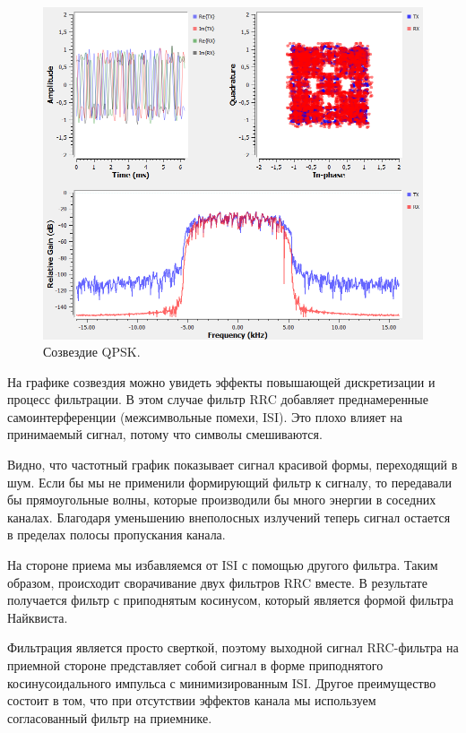 \documentclass[a4paper, 14pt]{extarticle}
\begin{document}
    \begin{figure}[h]
        \centering
        \includegraphics[width=0.8\linewidth]{resources/Images/task1_up_samling}
        \caption{Созвездие QPSK.}
        \label{fig:task1_up_samling}
    \end{figure}

    На графике созвездия можно увидеть эффекты повышающей дискретизации и процесс фильтрации.
    В этом случае фильтр RRC добавляет преднамеренные самоинтерференции (межсимвольные помехи, ISI).
    Это плохо влияет на принимаемый сигнал, потому что символы смешиваются.

    Видно, что частотный график показывает сигнал красивой формы, переходящий в шум.
    Если бы мы не применили формирующий фильтр к сигналу, то передавали бы прямоугольные волны,
    которые производили бы много энергии в соседних каналах.
    Благодаря уменьшению внеполосных излучений теперь сигнал остается в пределах полосы пропускания канала.

    На стороне приема мы избавляемся от ISI с помощью другого фильтра.
    Таким образом, происходит сворачивание двух фильтров RRC вместе.
    В результате получается фильтр с приподнятым косинусом, который является формой фильтра Найквиста.

    Фильтрация является просто сверткой, поэтому выходной сигнал RRC-фильтра на приемной стороне
    представляет собой сигнал в форме приподнятого косинусоидального импульса с минимизированным ISI.
    Другое преимущество состоит в том, что при отсутствии эффектов канала мы используем согласованный фильтр на приемнике.

    \newpage
\end{document}

